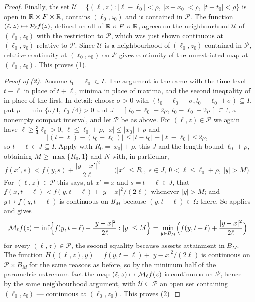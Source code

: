 \begin{proof}
Finally, the set
$\mathcal U=\{(\ell,z):|\ell-\ell_0|<\rho,\ |x-x_0|<\rho,\ |t-t_0|<\rho\}$
is open in $\mathbb{R}\times F\times\mathbb{R}$, contains $(\ell_0,z_0)$ and is contained in
$\mathcal P$. The function $(\ell,z)\mapsto\mathcal{P}_\ell f(z)$, defined on all of
$\mathbb{R}\times F\times\mathbb{R}$, agrees on the neighbourhood $\mathcal U$ of
$(\ell_0,z_0)$ with the restriction to $\mathcal P$, which was just shown
continuous at $(\ell_0,z_0)$ relative to $\mathcal P$. Since $\mathcal U$ is a
neighbourhood of $(\ell_0,z_0)$ contained in $\mathcal P$, relative continuity at
$(\ell_0,z_0)$ on $\mathcal P$ gives continuity of the unrestricted map at
$(\ell_0,z_0)$. This proves (1).

\emph{Proof of (2).}
Assume $t_0-\ell_0\in I$. The argument is the same with the time level $t-\ell$
in place of $t+\ell$, minima in place of maxima, and the second inequality of
 in place of the first. In detail: choose
$\sigma>0$ with $(t_0-\ell_0-\sigma,t_0-\ell_0+\sigma)\subseteq I$, put
$\rho=\min\{\sigma/4,\ell_0/4\}>0$ and
$J=[\,t_0-\ell_0-2\rho,\ t_0-\ell_0+2\rho\,]\subseteq I$, a nonempty compact
interval, and let $\mathcal P$ be as above. For $(\ell,z)\in\mathcal P$ we again
have $\ell\ge\tfrac34\ell_0>0$, $\ell\le\ell_0+\rho$, $|x|\le|x_0|+\rho$ and
\[
  |(t-\ell)-(t_0-\ell_0)|\le|t-t_0|+|\ell-\ell_0|\le2\rho ,
\]
so $t-\ell\in J\subseteq I$. Apply  with
$R_0=|x_0|+\rho$, this $J$ and the length bound $\ell_0+\rho$, obtaining
$M\ge\max\{R_0,1\}$ and $N$ with, in particular,
\[
  f(x',s)<f(y,s)+\frac{|y-x'|^2}{2\ell}
  \qquad\bigl(|x'|\le R_0,\ s\in J,\ 0<\ell\le\ell_0+\rho,\ |y|>M\bigr).
\]
For $(\ell,z)\in\mathcal P$ this says, at $x'=x$ and $s=t-\ell\in J$, that
$f(x,t-\ell)<f(y,t-\ell)+|y-x|^2/(2\ell)$ whenever $|y|>M$; and
$y\mapsto f(y,t-\ell)$ is continuous on $B_M$ because $(y,t-\ell)\in\Omega$
there. So  applies and gives
\[
  \mathcal{M}_\ell f(z)
  =\inf\Bigl\{f(y,t-\ell)+\frac{|y-x|^2}{2\ell}:|y|\le M\Bigr\}
  =\min_{y\in B_M}\Bigl(f(y,t-\ell)+\frac{|y-x|^2}{2\ell}\Bigr)
\]
for every $(\ell,z)\in\mathcal P$, the second equality because
 asserts attainment in $B_M$. The function
$H((\ell,z),y)=f(y,t-\ell)+|y-x|^2/(2\ell)$ is continuous on
$\mathcal P\times B_M$ for the same reasons as before, so by the minimum half of
the parametric-extremum fact the map $(\ell,z)\mapsto\mathcal{M}_\ell f(z)$ is
continuous on $\mathcal P$, hence — by the same neighbourhood argument, with
$\mathcal U\subseteq\mathcal P$ an open set containing $(\ell_0,z_0)$ —
continuous at $(\ell_0,z_0)$. This proves (2).
\end{proof}
